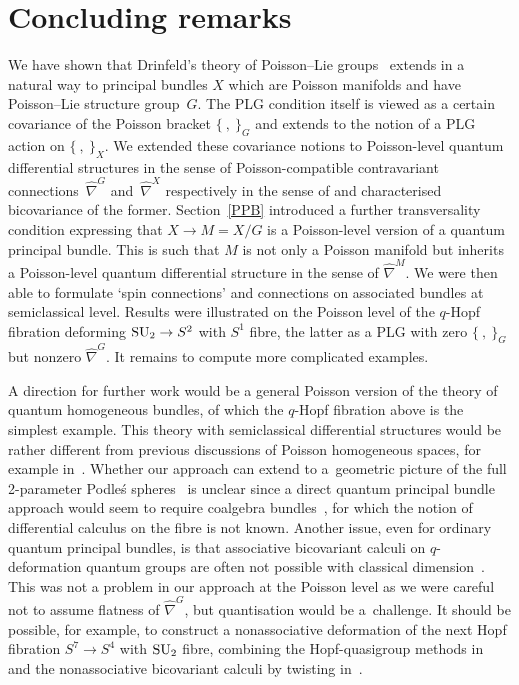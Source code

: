 \documentclass[pdftex]{sigma}
\numberwithin{equation}{section}
\newcommand{\<}{{\langle}}
\renewcommand{\>}{{\rangle}}
\begin{document}
\section{Concluding remarks}

We have shown that Drinfeld's theory of Poisson--Lie groups~\cite{Dri:ham, Drinfeld} extends in a natural way to principal bundles $X$ which are Poisson manifolds and have Poisson--Lie structure group~$G$. The PLG condition itself is viewed as a certain covariance of the Poisson bracket $\{\ ,\ \}_G$ and extends to the notion of a PLG action on $\{\ ,\ \}_X$. We extended these covariance notions to Poisson-level quantum differential structures in the sense of Poisson-compatible contravariant connections~$\hat\nabla^G$ and~$\hat\nabla^X$ respectively in the sense of \cite{BegMa:sem,Fer,Haw, Hue,MaTao:plg} and characterised bicovariance of the former. Section~\ref{PPB} introduced a further transversality condition expressing that $X\to M=X/G$ is a Poisson-level version of a quantum principal bundle. This is such that $M$ is not only a Poisson manifold but inherits a Poisson-level quantum differential structure in the sense of $\hat\nabla^M$. We were then able to formulate `spin connections' and connections on associated bundles at semiclassical level. Results were illustrated on the Poisson level of the $q$-Hopf fibration deforming ${\rm SU}_2\to S^2$ with $S^1$ fibre, the latter as a PLG with zero $\{\ ,\ \}_G$ but nonzero $\hat\nabla^G$. It remains to compute more complicated examples.

A direction for further work would be a general Poisson version of the theory of quantum homogeneous bundles, of which the $q$-Hopf fibration above is the simplest example. This theory with semiclassical differential structures would be rather different from previous discussions of Poisson homogeneous spaces, for example in~\cite{Dri:hom}. Whether our approach can extend to a~geometric picture of the full 2-parameter Podle\'s spheres~\cite{Pod} is unclear since a direct quantum principal bundle approach would seem to require coalgebra bundles~\cite{BrzMa:coa}, for which the notion of differential calculus on the fibre is not known. Another issue, even for ordinary quantum principal bundles, is that associative bicovariant calculi on $q$-deformation quantum groups are often not possible with classical dimension~\cite{BegMa:sem}. This was not a problem in our approach at the Poisson level as we were careful not to assume flatness of $\hat\nabla^G$, but quantisation would be a~challenge. It should be possible, for example, to construct a nonassociative deformation of the next Hopf fibration $S^7 \to S^4$ with ${\rm SU}_2$ fibre, combining the Hopf-quasigroup methods in~\cite{KliMa} and the nonassociative bicovariant calculi by twisting in~\cite{BegMa:sem,BegMa:twi}.
\end{document}
